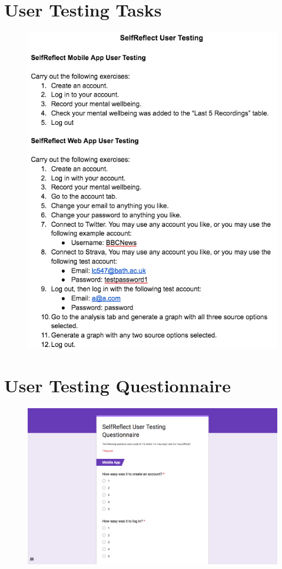 \documentclass[11pt,openright,a4paper]{report}
\begin{document}
\begin{appendices}
\section{User Testing Tasks} \label{app:testing:tasks}
\begin{figure}[ht]
  \centering
  \includegraphics[width=.8\textwidth]{i/testingtasks.png}
\end{figure}

\clearpage
\section{User Testing Questionnaire} \label{app:testing:questionnaire}
\begin{figure}[ht]
  \centering
  \includegraphics[width=\textwidth]{i/testingquestionnaire1.png}
\end{figure}


\end{appendices}
\end{document}

